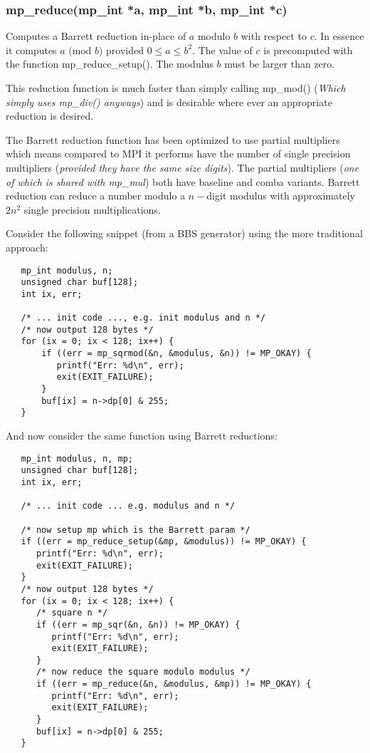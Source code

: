 \documentclass{article}
\begin{document}
\subsubsection{mp\_reduce(mp\_int *a, mp\_int *b, mp\_int *c)}
Computes a Barrett reduction in-place of $a$ modulo $b$ with respect to $c$.  In essence it computes 
$a \mbox{ (mod }b\mbox{)}$ provided $0 \le a \le b^2$.  The value of $c$ is precomputed with the 
function mp\_reduce\_setup().  The modulus $b$ must be larger than zero.

This reduction function is much faster than simply calling mp\_mod() (\textit{Which simply uses mp\_div() anyways}) and is
desirable where ever an appropriate reduction is desired.  

The Barrett reduction function has been optimized to use partial multipliers which means compared to MPI it performs
have the number of single precision multipliers (\textit{provided they have the same size digits}).  The partial
multipliers (\textit{one of which is shared with mp\_mul}) both have baseline and comba variants.  Barrett reduction 
can reduce a number modulo a $n-$digit modulus with approximately $2n^2$ single precision multiplications.  

Consider the following snippet (from a BBS generator) using the more traditional approach:

\begin{small}
\begin{verbatim}
   mp_int modulus, n;
   unsigned char buf[128];
   int ix, err;
   
   /* ... init code ..., e.g. init modulus and n */
   /* now output 128 bytes */
   for (ix = 0; ix < 128; ix++) { 
       if ((err = mp_sqrmod(&n, &modulus, &n)) != MP_OKAY) {
          printf("Err: %d\n", err);
          exit(EXIT_FAILURE);
       }
       buf[ix] = n->dp[0] & 255;
   }
\end{verbatim}
\end{small}

And now consider the same function using Barrett reductions:

\begin{small}
\begin{verbatim}
   mp_int modulus, n, mp;
   unsigned char buf[128];
   int ix, err;
   
   /* ... init code ... e.g. modulus and n */
   
   /* now setup mp which is the Barrett param */
   if ((err = mp_reduce_setup(&mp, &modulus)) != MP_OKAY) {
      printf("Err: %d\n", err);
      exit(EXIT_FAILURE);
   }
   /* now output 128 bytes */
   for (ix = 0; ix < 128; ix++) {
      /* square n */
      if ((err = mp_sqr(&n, &n)) != MP_OKAY) {
         printf("Err: %d\n", err);
         exit(EXIT_FAILURE);
      }
      /* now reduce the square modulo modulus */
      if ((err = mp_reduce(&n, &modulus, &mp)) != MP_OKAY) {
         printf("Err: %d\n", err);
         exit(EXIT_FAILURE);
      }
      buf[ix] = n->dp[0] & 255;
   }
\end{verbatim}	
\end{small}
\end{document}
